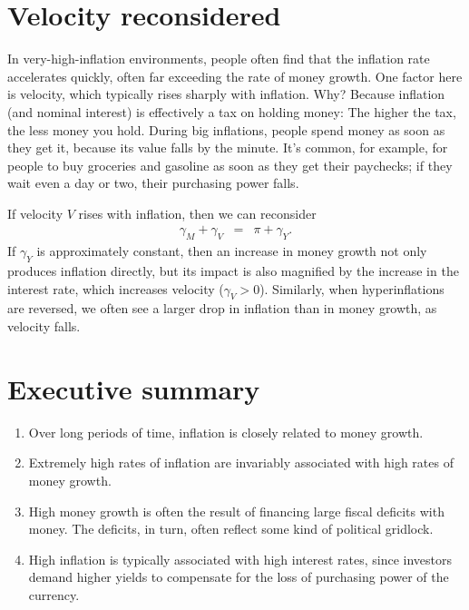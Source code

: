 \section{Velocity reconsidered}

In very-high-inflation environments,
people often find that the inflation rate accelerates
quickly, often far exceeding the rate of money growth.
One factor here is velocity, which typically
rises sharply with inflation.
Why?
Because inflation (and nominal interest) is effectively a tax on holding money:
The higher the tax, the less money you hold.
During big inflations,
people spend money as soon as they get it, because its
value falls by the minute.
It's common, for example, for people to buy groceries
and gasoline as soon as they get their paychecks;
if they wait even a day or two, their purchasing power falls.

If velocity $V$ rises with inflation, then we can reconsider
\begin{eqnarray}
    \gamma_M + \gamma_V  &=&  \pi + \gamma_Y .
\end{eqnarray}
If $\gamma_Y$ is approximately constant,
then an increase in money growth not only
produces inflation directly, but
its impact is also magnified by the increase in the
interest rate, which increases velocity ($\gamma_V > 0$).
Similarly, when hyperinflations are reversed,
we often see a larger drop in inflation
than in money growth, as velocity falls.


\section*{Executive summary}

\begin{enumerate}
\item Over long periods of time, inflation is closely related to money growth.


\item Extremely high rates of inflation are invariably associated with high rates of money growth.

\item High money growth is often the result of financing large fiscal deficits with money.
    The deficits, in turn, often reflect some kind of political gridlock.

\item High inflation is typically associated with high interest rates,
since investors demand higher yields 
 to compensate for the loss of purchasing
power of the currency.
\end{enumerate}


